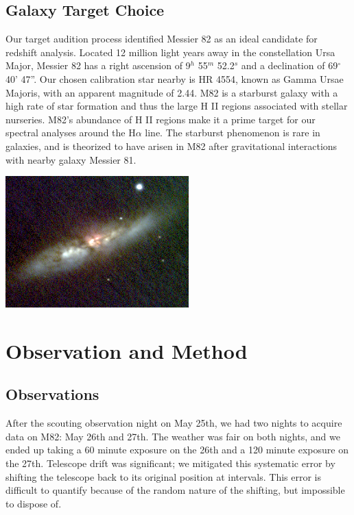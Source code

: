 \documentclass[useAMS,usenatbib]{mn2e}
\begin{document}
    
\subsection*{Galaxy Target Choice}

Our target audition process identified Messier 82 as an ideal candidate for redshift analysis. Located 12 million light years away in the constellation Ursa Major, Messier 82 has a right ascension of 9$^{h}$ 55$^{m }$ 52.2$^{s}$ and a declination of 69$^{\circ}$ 40' 47''. Our chosen calibration star nearby is HR 4554, known as Gamma Ursae Majoris, with an apparent magnitude of 2.44. M82 is a starburst galaxy with a high rate of star formation and thus the large H II regions associated with stellar nurseries. M82's abundance of H II regions make it a prime target for our spectral analyses around the H$\alpha$ line. The starburst phenomenon is rare in galaxies, and is theorized to have arisen in M82 after gravitational interactions with nearby galaxy Messier 81.

\includegraphics[width=200pt]{M82-color-image-cropped.png}

\section*{Observation and Method}

\subsection*{Observations}

After the scouting observation night on May 25th, we had two nights to acquire data on M82: May 26th and 27th. The weather was fair on both nights, and we ended up taking a 60 minute exposure on the 26th and a 120 minute exposure on the 27th. Telescope drift was significant; we mitigated this systematic error by shifting the telescope back to its original position at intervals. This error is difficult to quantify because of the random nature of the shifting, but impossible to dispose of.
\vspace{5mm}
\end{document}
